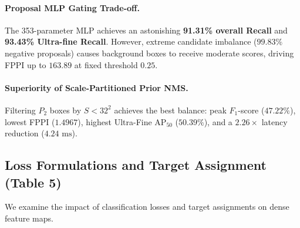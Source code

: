 \documentclass[runningheads]{llncs}
\begin{document}
\paragraph{Proposal MLP Gating Trade-off.} The 353-parameter MLP achieves an astonishing \textbf{91.31\% overall Recall} and \textbf{93.43\% Ultra-fine Recall}. However, extreme candidate imbalance ($99.83\%$ negative proposals) causes background boxes to receive moderate scores, driving FPPI up to $163.89$ at fixed threshold $0.25$.
\paragraph{Superiority of Scale-Partitioned Prior NMS.} Filtering $P_2$ boxes by $S < 32^2$ achieves the best balance: peak $F_1$-score ($47.22\%$), lowest FPPI ($1.4967$), highest Ultra-Fine $\text{AP}_{50}$ ($50.39\%$), and a $2.26\times$ latency reduction ($4.24\text{ ms}$).

\subsection{Loss Formulations and Target Assignment (Table 5)}
We examine the impact of classification losses and target assignments on dense feature maps.

\begin{table}[!t]
\centering
\caption{Ablation of target assignment and loss formulations on the $P_2$ head.}
\label{tab:loss_ablation}
\end{table}
\end{document}
